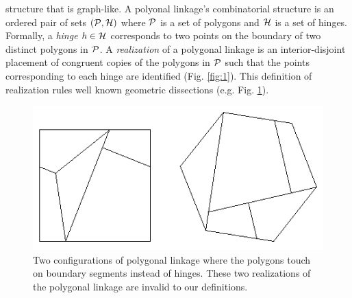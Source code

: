 structure that is graph-like.  A polyonal linkage's combinatorial structure is an ordered pair of 
sets $\left({\cal P},{\cal H} \right)$ where ${\cal P}$ is a set of polygons and ${\cal H}$ is a set of hinges.  
Formally, a \textit{hinge} $h\in {\cal H}$ 
corresponds to two points on the boundary of two distinct polygons in ${\cal P}$.  A \emph{realization} 
of a polygonal linkage is an interior-disjoint placement of 
congruent copies of the polygons in ${\cal P}$ such that the points corresponding to each hinge are 
identified (Fig. \ref{fig:1}). This definition of realization rules well known geometric 
dissections (e.g. Fig. \ref{fig:polygonallinkage-4}).
\begin{figure}[h]
\begin{center}
\includegraphics[scale=1]{graphics/polygonaldissection.png}
\end{center}
\caption{Two configurations of polygonal linkage where the polygons touch on boundary segments 
instead of hinges.  These two realizations of the polygonal linkage are invalid to our definitions. 
 }
\label{fig:polygonallinkage-4}
\end{figure}




